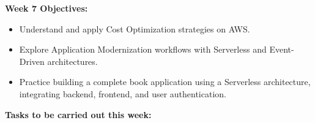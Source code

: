 \vspace{0.5em}\noindent\textbf{Week 7 Objectives:}\par

\begin{itemize}
\tightlist
\item
  Understand and apply Cost Optimization strategies on AWS.
\item
  Explore Application Modernization workflows with Serverless and
  Event-Driven architectures.
\item
  Practice building a complete book application using a Serverless
  architecture, integrating backend, frontend, and user authentication.
\end{itemize}

\vspace{0.5em}\noindent\textbf{Tasks to be carried out this
week:}\par

